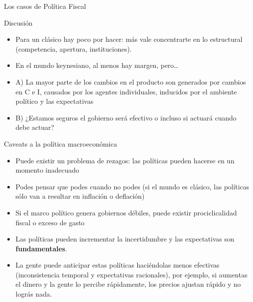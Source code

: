 \documentclass{beamer}
\begin{document}
\begin{frame}{Los casos de Política Fiscal}
{
}
\end{frame}


\begin{frame}{Discusión}

    \begin{itemize}
    \item Para un clásico hay poco por hacer: más vale concentrarte en lo estructural (competencia, apertura, instituciones).
    \item En el mundo keynesiano, al menos hay margen, pero…
    \item A) La mayor parte de los cambios en el producto son generados por cambios en C e I, causados por los agentes individuales, inducidos por el ambiente político y las expectativas
    \item B) ¿Estamos seguros el gobierno será efectivo o incluso si actuará cuando debe actuar? 
    \end{itemize}

\end{frame}

\begin{frame}{Caveats a la política macroeconómica}
    \begin{itemize}
    \item Puede existir un problema de rezagos: las políticas pueden hacerse en un momento inadecuado
    \item Podes pensar que podes cuando no podes (si el mundo es clásico, las políticas sólo van a resultar en inflación o deflación)
    \item Si el marco político genera gobiernos débiles, puede existir prociclicalidad fiscal o exceso de gasto
    \item Las políticas pueden incrementar la incertidumbre y las expectativas son \textbf{fundamentales}.
    \item La gente puede anticipar estas políticas haciéndolas menos efectivas (inconsistencia temporal y expectativas racionales), por ejemplo, si aumentas el dinero y la gente lo percibe rápidamente, los precios ajustan rápido y no lográs nada.
    \end{itemize}
\end{frame}
\end{document}
